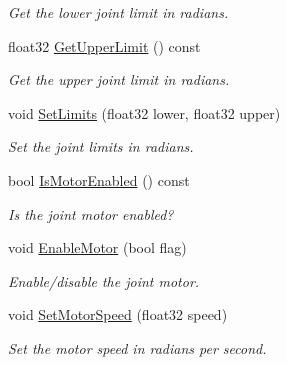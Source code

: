 \begin{DoxyCompactItemize}
\begin{DoxyCompactList}\small\item\em Get the lower joint limit in radians. \end{DoxyCompactList}\item 
\mbox{\label{classb2RevoluteJoint_a5c30cf83116841607d4d819985732efb}} 
float32 \hyperlink{classb2RevoluteJoint_a5c30cf83116841607d4d819985732efb}{Get\+Upper\+Limit} () const
\begin{DoxyCompactList}\small\item\em Get the upper joint limit in radians. \end{DoxyCompactList}\item 
\mbox{\label{classb2RevoluteJoint_a32f9393d8a6b993fd523f0f643c28107}} 
void \hyperlink{classb2RevoluteJoint_a32f9393d8a6b993fd523f0f643c28107}{Set\+Limits} (float32 lower, float32 upper)
\begin{DoxyCompactList}\small\item\em Set the joint limits in radians. \end{DoxyCompactList}\item 
\mbox{\label{classb2RevoluteJoint_a37d5744e89991ebe01b974c4d15a21b5}} 
bool \hyperlink{classb2RevoluteJoint_a37d5744e89991ebe01b974c4d15a21b5}{Is\+Motor\+Enabled} () const
\begin{DoxyCompactList}\small\item\em Is the joint motor enabled? \end{DoxyCompactList}\item 
\mbox{\label{classb2RevoluteJoint_a80ed5a07d9a0e07d010808a73ffae6ff}} 
void \hyperlink{classb2RevoluteJoint_a80ed5a07d9a0e07d010808a73ffae6ff}{Enable\+Motor} (bool flag)
\begin{DoxyCompactList}\small\item\em Enable/disable the joint motor. \end{DoxyCompactList}\item 
\mbox{\label{classb2RevoluteJoint_a56f60bb1ea69048c8a455da49d62bf65}} 
void \hyperlink{classb2RevoluteJoint_a56f60bb1ea69048c8a455da49d62bf65}{Set\+Motor\+Speed} (float32 speed)
\begin{DoxyCompactList}\small\item\em Set the motor speed in radians per second. \end{DoxyCompactList}\item 

\end{DoxyCompactItemize}
